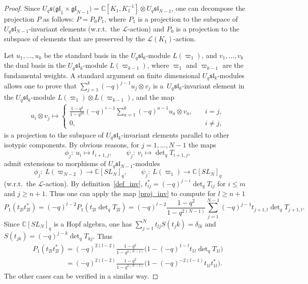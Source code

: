 \begin{proof} Since $U_q \mathfrak{s(gl}_1 \times \mathfrak{gl}_{N-1})=\mathbb C[K_1,K_1^{-1}] \otimes U_q
\mathfrak{sl}_{N-1}$, one can decompose the projection $P$ as follows: $P=P_0P_1$, where $P_1$ is a
projection to the subspace of $U_q \mathfrak{sl}_{N-1}$-invariant elements (w.r.t.\ the $\mathcal{L}$-action)
and $P_0$ is a projection to the subspace of elements that are preserved by the $\mathcal{L}(K_1)$-action.

Let $u_1,\dots,u_k$ be the standard basis in the $U_q \mathfrak{sl}_k$-module $L(\varpi_1)$, and
$v_1,\ldots,v_k$ the dual basis in the $U_q \mathfrak{sl}_k$-module $L(\varpi_{k-1})$, where $\varpi_1$ and
$\varpi_{k-1}$ are the fundamental weights. A standard argument on f\/inite dimensional $U_q
\mathfrak{sl}_k$-modules allows one to prove that $\sum\limits_{j=1}^k (-q)^{j-1}u_j \otimes v_j$ is a~$U_q
\mathfrak{sl}_k$-invariant element in the $U_q \mathfrak{sl}_k$-module $L(\varpi_1) \otimes L(\varpi_{k-1})$,
and the map
\begin{gather}\label{proj_inv}
u_i \otimes v_j \mapsto \begin{cases} \displaystyle \frac{1-q^2}{1-q^{2k}}(-q)^{i-1}\sum_{a=1}^k (-q)^{a-1} u_a \otimes v_a, \quad &  i=j,
\\ 0, \quad & i \neq j,
\end{cases}
\end{gather}
is a projection to the subspace of $U_q \mathfrak{sl}_k$-invariant elements parallel to other isotypic
components. By obvious reasons, for $j=1,\ldots,N-1$ the maps
\[
\phi_j: \ u_i \mapsto t_{i+1,j},\qquad \psi_j: \ v_i \mapsto \det \nolimits_q T_{i+1,j},
 \] admit extensions to morphisms of
$U_q \mathfrak{sl}_{N-1}$-modules
\[
\phi_j: \ L(\varpi_{N-2}) \rightarrow \mathbb C[SL_N]_q, \qquad \psi_j: \ L(\varpi_1) \rightarrow \mathbb
C[SL_N]_q
\]
(w.r.t.\ the $\mathcal{L}$-action). By def\/inition~\eqref{def_inv}, $t_{ij}^*=(-q)^{j-i}\det \nolimits_qT_{ij}$
for $i \leq m$ and $j \geq n+1$. Thus one can apply the map \eqref{proj_inv} to compute for $l \geq n+1$
\[
P_1(t_{2l}t_{2l}^*)=(-q)^{l-2}P_1(t_{2l} \det \nolimits_q T_{2l})
=(-q)^{l-2}\frac{1-q^2}{1-q^{2(N-1)}}\sum_{j=1}^{N-1}(-q)^{j-1}t_{j+1,l}\det \nolimits_q T_{j+1,l}.
\]
Since $\mathbb C[SL_N]_q$ is a Hopf algebra, one has $\sum\limits_{j=1}^{N} t_{lj}S(t_jk)=\delta_{lk}$ and
$S(t_{jk})=(-q)^{j-k}\det \nolimits_q T_{kj}$. Thus
\begin{gather*}
P_1(t_{2l}t_{2l}^*)=(-q)^{2(l-2)}\frac{1-q^2}{1-q^{2(N-1)}}\big( 1-(-q)^{1-l}t_{1l}\det \nolimits_q
T_{1l}\big)
\\
\phantom{P_1(t_{2l}t_{2l}^*)}{} = (-q)^{2(l-2)}\frac{1-q^2}{1-q^{2(N-1)}}\big( 1-(-q)^{-2(l-1)}t_{1l}t_{1l}^*\big).
\end{gather*}
The other cases can be verif\/ied in a similar way. \end{proof}

